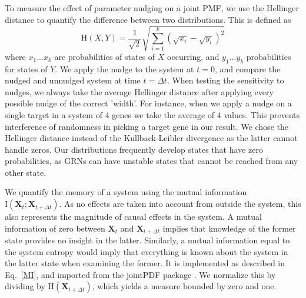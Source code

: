 \documentclass[../main.tex]{subfiles}
\begin{document}
To measure the effect of parameter nudging on a joint PMF, we use the Hellinger distance to quantify the difference between two distributions.
This is defined as
%
\begin{equation}
\mathrm{H}\left( X, Y\right) = \frac{1}{\sqrt{2}} \sqrt{\sum^k_{i=1} (\sqrt{x_i} - \sqrt{y_i})^2}
\end{equation}
%
where ${x_1 ... x_k}$ are probabilities of states of $X$ occurring, and ${y_1 ... y_k}$ probabilities for states of $Y$.
We apply the nudge to the system at $t = 0$, and compare the nudged and unnudged system at time $t = \Delta t$.
When testing the sensitivity to nudges, we always take the average Hellinger distance after applying every possible nudge of the correct 'width'.
For instance, when we apply a nudge on a single target in a system of 4 genes we take the average of 4 values.
This prevents interference of randomness in picking a target gene in our result.
We chose the Hellinger distance instead of the Kullback-Leibler divergence as the latter cannot handle zeros.
Our distributions frequently develop states that have zero probabilities, as GRNs can have unstable states that cannot be reached from any other state.

We quantify the memory of a system using the mutual information $\mathrm{I}\left(\mathbf{X}_t ; \mathbf{X}_{t + \Delta t}\right)$.
As no effects are taken into account from outside the system, this also represents the magnitude of causal effects in the system.
A mutual information of zero between $\mathbf{X}_t$ and $\mathbf{X}_{t + \Delta t}$ implies that knowledge of the former state provides no insight in the latter.
Similarly, a mutual information equal to the system entropy would imply that everything is known about the system in the latter state when examining the former.
It is implemented as described in Eq.~\ref{MI}, and imported from the jointPDF package \cite{jointpdf}.
We normalize this by dividing by $\mathrm{H}\left(\mathbf{X}_{t + \Delta t}\right)$, which yields a measure bounded by zero and one.
\end{document}
